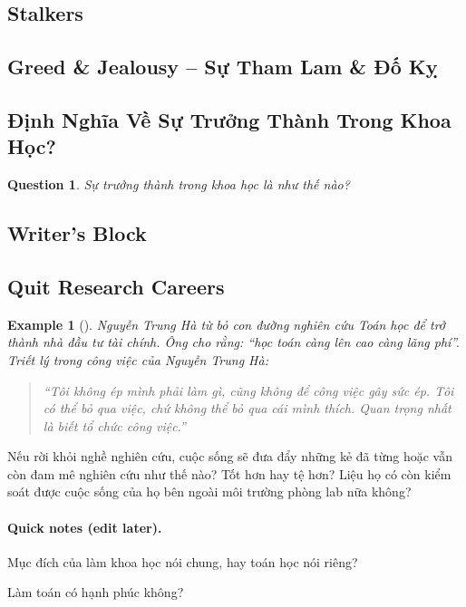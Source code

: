 \documentclass{article}
\numberwithin{equation}{section}
\newtheorem{example}{Example}[section]
\newtheorem{ques}{Question}[section]
\begin{document}
\subsection{Stalkers}

\subsection{Greed \& Jealousy -- Sự Tham Lam \& Đố Kỵ}

\subsection{Định Nghĩa Về Sự Trưởng Thành Trong Khoa Học?}
\begin{ques}
	Sự trưởng thành trong khoa học là như thế nào?
\end{ques}

\subsection{Writer's Block}

\subsection{Quit Research Careers}

\begin{example}[\cite{VNE/NTH}]
	Nguyễn Trung Hà từ bỏ con đường nghiên cứu Toán học để trở thành nhà đầu tư tài chính. Ông cho rằng: ``học toán càng lên cao càng lãng phí''. Triết lý trong công việc của Nguyễn Trung Hà:
	\begin{quotation}
		``Tôi không ép mình phải làm gì, cũng không để công việc gây sức ép. Tôi có thể bỏ qua việc, chứ không thể bỏ qua cái mình thích. Quan trọng nhất là biết tổ chức công việc.''
	\end{quotation}
	
\end{example}
Nếu rời khỏi nghề nghiên cứu, cuộc sống sẽ đưa đẩy những kẻ đã từng hoặc vẫn còn đam mê nghiên cứu như thế nào? Tốt hơn hay tệ hơn? Liệu họ có còn kiểm soát được cuộc sống của họ bên ngoài môi trường phòng lab nữa không?


\paragraph{Quick notes (edit later).}
Mục đích của làm khoa học nói chung, hay toán học nói riêng?

Làm toán có hạnh phúc không?
\end{document}
